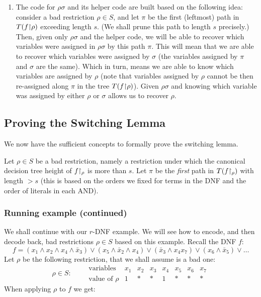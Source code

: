 \begin{tcolorbox}[colframe=white, colback=blue!4, boxrule=0mm, sharp corners]
\begin{enumerate}
    \item  \label{it:recover-code-SL-upshot}
    The code for $\rho\sigma$  and its helper code are built based on the following  idea: consider a bad restriction \( \rho \in S \), and let \( \pi \) be the first (leftmost) path in \( T(f{\upharpoonright}\rho) \) exceeding length \( s \). 
        (We shall prune this path to length \( s \) precisely.)
Then, given only \( \rho\sigma \) and the helper code, we will be able to recover which variables were assigned in \( \rho\sigma \) by this path \( \pi \).     
 This will mean that we are able to recover which variables were assigned by $\sigma$ (the variables assigned by $\pi$ and $\sigma$ are the same). Which in turn, means we are able to know which variables are assigned by $\rho$ (note that variables assigned by $\rho$ cannot be then re-assigned along $\pi$ in the tree $T(f{\upharpoonright}\rho)$). Given $\rho\sigma$ and knowing which variable was assigned by either $\rho$ or $\sigma$ allows us to recover $\rho$.  
\end{enumerate}
\end{tcolorbox}

\subsection{Proving the Switching Lemma}
We now have the sufficient concepts to formally prove the switching lemma. 
 
Let \( \rho \in S \) be a bad restriction, namely a restriction under which the canonical decision tree height of $f{\upharpoonright_\rho}$ is more than $s$.  
Let \( \pi \) be the \emph{first} path in \( T(f{\upharpoonright_{\rho}}) \) with length \( > s \) (this is based on the orders we fixed for terms in the DNF and the order of literals in each AND).




\subsubsection{Running example (continued)}\label{sec:running-example}
We shall continue with our $r$-DNF example. We will see how to encode, and then decode back, bad restrictions $\rho\in S$ based on this example.  Recall the DNF $f$: 
\[
f = (x_1 \wedge x_2 \wedge x_4 \wedge \bar{x}_3) \vee (x_5 \wedge \bar{x}_2 \wedge x_4) \vee (\bar{x}_3 \wedge x_4 x_7) \vee (x_6 \wedge \bar{x}_5) \vee \dots
\]
Let $\rho$ be the following restriction, that we shall assume is a bad one: 
\[
\rho \in S:\qquad
\begin{array}{c|ccccccc}
  \text{variables}~~     & x_1 & x_2 & x_3 & x_4 & x_5 & x_6 & x_7\\ \hline
\text{value of }  \rho  & 1   & *   & *   & 1   & *   & *   & *
\end{array}
\]
When applying $\rho$ to $f$ we get:

